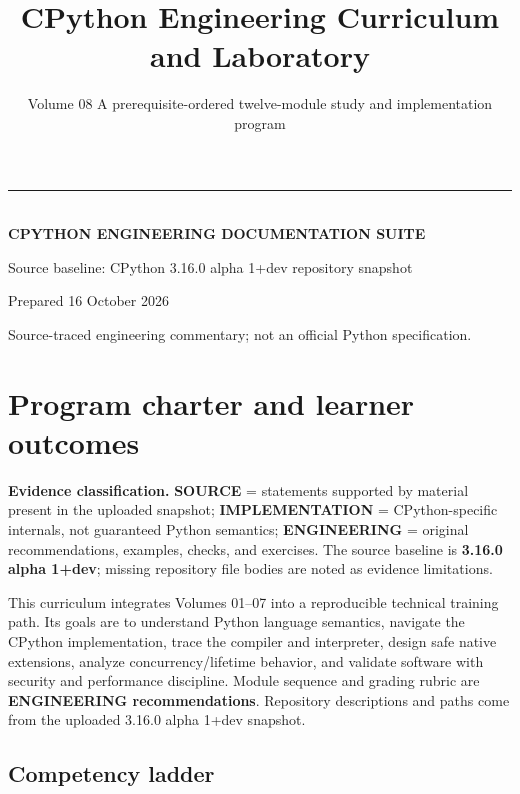 \documentclass[
  11pt,
]{report}
\title{CPython Engineering Curriculum and Laboratory}
\subtitle{Volume 08 \textbar{} A prerequisite-ordered twelve-module
study and implementation program}
\author{}
\date{}
\makeatletter
\renewcommand{\maketitle}{%
  \hypersetup{pageanchor=false}%
\begin{titlepage}\pagecolor{CPNavy}\color{white}\sffamily
  \vspace*{0.8in}
  {\color{CPGold}\rule{2.1in}{4pt}}\\[16pt]
  {\Large\bfseries CPYTHON ENGINEERING DOCUMENTATION SUITE}\\[24pt]
  {\Huge\bfseries \@title\par}\vspace{19pt}
  \vfill
  {\normalsize Source baseline: CPython 3.16.0 alpha 1+dev repository snapshot}\par
  {\normalsize Prepared 16 October 2026}\par
  {\small\color{white!70} Source-traced engineering commentary; not an official Python specification.}\vspace{0.65in}
  \end{titlepage}\hypersetup{pageanchor=true}\nopagecolor\color{black}
  }
\makeatother
\begin{document}
\maketitle

{
\setcounter{tocdepth}{1}
\tableofcontents
}
\chapter{Program charter and learner
outcomes}\label{program-charter-and-learner-outcomes}

\begin{sourcebox}
\textbf{Evidence classification.} \textbf{SOURCE} = statements supported by material present in the uploaded snapshot; \textbf{IMPLEMENTATION} = CPython-specific internals, not guaranteed Python semantics; \textbf{ENGINEERING} = original recommendations, examples, checks, and exercises. The source baseline is \textbf{3.16.0 alpha 1+dev}; missing repository file bodies are noted as evidence limitations.
\end{sourcebox}

This curriculum integrates Volumes 01--07 into a reproducible technical
training path. Its goals are to understand Python language semantics,
navigate the CPython implementation, trace the compiler and interpreter,
design safe native extensions, analyze concurrency/lifetime behavior,
and validate software with security and performance discipline. Module
sequence and grading rubric are \textbf{ENGINEERING recommendations}.
Repository descriptions and paths come from the uploaded 3.16.0 alpha
1+dev snapshot.

\section{Competency ladder}\label{competency-ladder}
\end{document}
